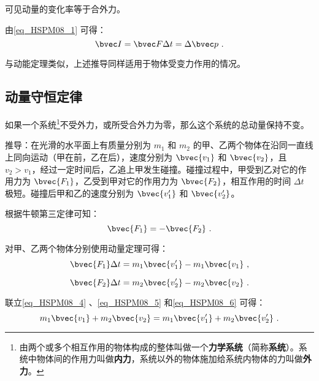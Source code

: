 可见动量的变化率等于合外力。

由\autoref{eq_HSPM08_1} 可得：
\begin{equation}\label{eq_HSPM08_3}
\bvec I=\bvec F\Delta t=\Delta \bvec p~.
\end{equation}

与动能定理类似，上述推导同样适用于物体受变力作用的情况。

\subsection{动量守恒定律}

如果一个系统\footnote{由两个或多个相互作用的物体构成的整体叫做一个\textbf{力学系统}（简称\textbf{系统}）。系统中物体间的作用力叫做\textbf{内力}，系统以外的物体施加给系统内物体的力叫做\textbf{外力}。}不受外力，或所受合外力为零，那么这个系统的总动量保持不变。

推导：在光滑的水平面上有质量分别为 $m_1$ 和 $m_2$ 的甲、乙两个物体在沿同一直线上同向运动（甲在前，乙在后），速度分别为 $\bvec{v_1}$ 和 $\bvec{v_2}$，且 $v_2>v_1$，经过一定时间后，乙追上甲发生碰撞。碰撞过程中，甲受到乙对它的作用力为 $\bvec {F_1}$，乙受到甲对它的作用力为 $\bvec {F_2}$，相互作用的时间 $\Delta t$ 极短。碰撞后甲和乙的速度分别为 $\bvec{v_1'}$ 和 $\bvec{v_2'}$。

根据牛顿第三定律可知：
\begin{equation}\label{eq_HSPM08_4}
\bvec {F_1}=-\bvec{F_2}~.
\end{equation}

对甲、乙两个物体分别使用动量定理可得：
\begin{equation}\label{eq_HSPM08_5}
\bvec{F_1}\Delta t=m_1\bvec{v_1'}-m_1\bvec{v_1}~,
\end{equation}

\begin{equation}\label{eq_HSPM08_6}
\bvec{F_2}\Delta t=m_2\bvec{v_2'}-m_2\bvec{v_2}~.
\end{equation}

联立\autoref{eq_HSPM08_4} 、\autoref{eq_HSPM08_5} 和\autoref{eq_HSPM08_6} 可得：
\begin{equation}
m_1\bvec{v_1}+ m_2\bvec{v_2}= m_1\bvec{v_1'}+ m_2\bvec{v_2'}~.
\end{equation}



